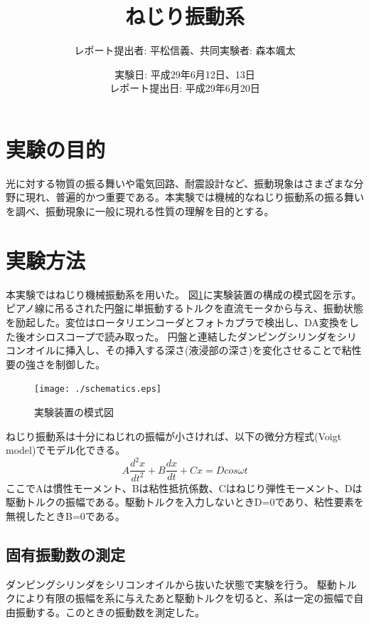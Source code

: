 \documentclass[11pt,a4]{jarticle}
\begin{document}
\title{ねじり振動系}
\author{レポート提出者: 平松信義、共同実験者: 森本颯太}
\date{実験日: 平成29年6月12日、13日\\レポート提出日: 平成29年6月20日}
\maketitle
\tableofcontents

\section{実験の目的}
光に対する物質の振る舞いや電気回路、耐震設計など、振動現象はさまざまな分野に現れ、普遍的かつ重要である。本実験では機械的なねじり振動系の振る舞いを調べ、振動現象に一般に現れる性質の理解を目的とする。

\section{実験方法}
本実験ではねじり機械振動系を用いた。
図\ref{fig:schematics}に実験装置の構成の模式図を示す。
ピアノ線に吊るされた円盤に単振動するトルクを直流モータから与え、振動状態を励起した。変位はロータリエンコーダとフォトカプラで検出し、DA変換をした後オシロスコープで読み取った。
円盤と連結したダンピングシリンダをシリコンオイルに挿入し、その挿入する深さ(液浸部の深さ)を変化させることで粘性要の強さを制御した。
\begin{figure}[htbp]
   \begin{center}
    \texttt{[image: ./schematics.eps]}
    \caption{実験装置の模式図}
     \label{fig:schematics}
   \end{center}
\end{figure}


ねじり振動系は十分にねじれの振幅が小さければ、以下の微分方程式(Voigt model)でモデル化できる。
\begin{equation}
A \frac{d^2 x}{dt^2} + B \frac{dx}{dt} + C x =  D cos \omega t  
\label{eq:Voigt_model}
\end{equation}
ここでAは慣性モーメント、Bは粘性抵抗係数、Cはねじり弾性モーメント、Dは駆動トルクの振幅である。駆動トルクを入力しないときD=0であり、粘性要素を無視したときB=0である。

\subsection{固有振動数の測定}
ダンピングシリンダをシリコンオイルから抜いた状態で実験を行う。
駆動トルクにより有限の振幅を系に与えたあと駆動トルクを切ると、系は一定の振幅で自由振動する。このときの振動数を測定した。
\end{document}
